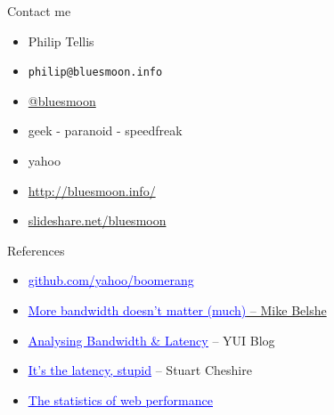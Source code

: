 \documentclass{beamer}
\begin{document}
\begin{frame}{Contact me}
  \begin{itemize}
  \item Philip Tellis
  \item \small{\texttt{philip@bluesmoon.info}}
  \item \href{http://twitter.com/bluesmoon}{@bluesmoon}
  \item geek - paranoid - speedfreak
  \item yahoo
  \item \href{http://bluesmoon.info/}{http://bluesmoon.info/}
  \item \href{http://www.slideshare.net/bluesmoon}{slideshare.net/bluesmoon}
  \end{itemize}
\end{frame}

\begin{frame}{References}
  \begin{itemize}
  \item \href{http://github.com/yahoo/boomerang/}{\textcolor{blue}{\underline{github.com/yahoo/boomerang}}}
  \item \href{http://www.belshe.com/2010/05/24/more-bandwidth-doesnt-matter-much/}{\textcolor{blue}{\underline{More bandwidth doesn't matter (much)}} -- Mike Belshe}
  \item \href{http://www.yuiblog.com/blog/2010/04/08/analyzing-bandwidth-and-latency/}{\textcolor{blue}{\underline{Analysing Bandwidth \& Latency}}} -- YUI Blog
  \item \href{http://www.stuartcheshire.org/rants/Latency.html}{\textcolor{blue}{\underline{It's the latency, stupid}}} -- Stuart Cheshire
  \item \href{http://www.slideshare.net/bluesmoon/index-3441823}{\textcolor{blue}{\underline{The statistics of web performance}}}
  \end{itemize}
\end{frame}
\end{document}
